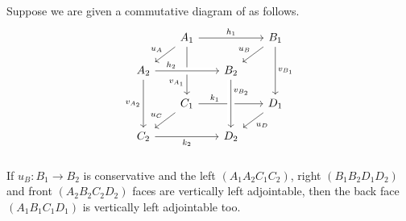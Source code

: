 \documentclass[a4paper,10pt, oneside]{amsart}
\begin{document}
	\begin{lem}\label{bccondconserv}
		Suppose we are given a commutative diagram of \infcats as follows.
		$$\begin{tikzcd}[row sep=scriptsize, column sep=scriptsize]
			& A_1 \arrow[dl, "u_A"'] \arrow[rr, "h_1"] \arrow[dd, "v_{A_1}"' near end] & & B_1 \arrow[dl, "u_B"'] \arrow[dd, "v_{B_1}"] \\
			A_2 \arrow[rr, crossing over, "h_2" near start] \arrow[dd, "v_{A_2}"'] & & B_2 \\
			& C_1 \arrow[dl, "u_C"'] \arrow[rr, "k_1" near start] & & D_1 \arrow[dl, "u_D"] \\
			C_2 \arrow[rr, "k_2"'] & & D_2 \arrow[from=uu, crossing over, "v_{B_2}" near start]\\
		\end{tikzcd}$$
		If $u_B: B_1\to B_2$ is conservative and the left $(A_1A_2C_1C_2)$, right $(B_1B_2D_1D_2)$ and front $(A_2B_2C_2D_2)$ faces are vertically left adjointable, then the back face $(A_1B_1C_1D_1)$ is vertically left adjointable too.
		
	\end{lem}
\end{document}
